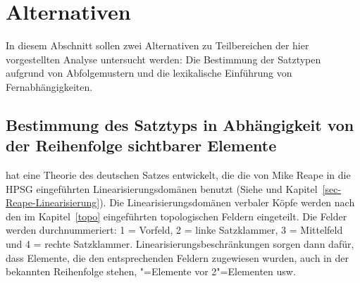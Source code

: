 

\section{Alternativen}



In diesem Abschnitt sollen zwei Alternativen zu Teilbereichen der hier vorgestellten
Analyse untersucht werden: Die Bestimmung der Satztypen aufgrund von Abfolgemustern und die
lexikalische Einführung von Fernabhängigkeiten.

\subsection{Bestimmung des Satztyps in Abhängigkeit von der Reihenfolge sichtbarer Elemente}
\label{sec-satztypen-kathol}

\mbox{}\citet{Kathol95a,Kathol97a,Kathol2000a,Kathol2001a} hat eine Theorie des deutschen
Satzes entwickelt, die die von Mike Reape in die HPSG eingeführten Linearisierungsdomänen
benutzt (Siehe  und Kapitel~\ref{sec-Reape-Linearisierung}).
Die Linearisierungsdomänen verbaler Köpfe werden nach den im Kapitel~\ref{topo} eingeführten topologischen Feldern
eingeteilt. Die Felder werden durchnummeriert: 1 = Vorfeld, 2 = linke Satzklammer, 3 = Mittelfeld
und 4 = rechte Satzklammer. Linearisierungsbeschränkungen sorgen dann dafür, dass Elemente,
die den entsprechenden Feldern zugewiesen wurden, auch in der bekannten Reihenfolge stehen,
"=Elemente vor 2"=Elementen usw.

